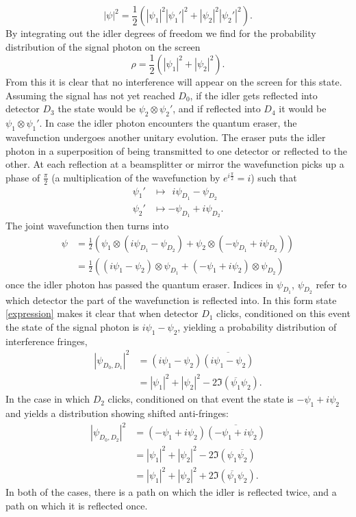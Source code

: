\documentclass[11pt]{article}
\numberwithin{equation}{section}
\begin{document}
\begin{equation}
|\psi|^2= \frac{1}{2}(|\psi_1|^2|\psi_1'|^2+|\psi_2|^2|\psi_2'|^2).
\end{equation} By integrating out the idler degrees of freedom we find for the probability distribution of the signal photon on the screen
\begin{equation}
\rho= \frac{1}{2}(|\psi_1|^2+|\psi_2|^2).
\end{equation} From this it is clear that no interference will appear on the screen for this state. Assuming the signal has not yet reached $D_0$, if the idler gets reflected into detector $D_3$ the state would be $\psi_2\otimes \psi_2'$, and if reflected into $D_4$ it would be $\psi_1\otimes \psi_1'$. 
In case the idler photon encounters the quantum eraser, the wavefunction undergoes another unitary evolution. The eraser puts the idler photon in a superposition of being transmitted to one detector or reflected to the other. At each reflection at a beamsplitter or mirror the wavefunction picks up a phase of $\frac{\pi}{2}$ (a multiplication of the wavefunction by $e^{i\frac{\pi}{2}}=i$) such that
\begin{align}
\psi_1' &\mapsto \ ~ i\psi_{D_1}-\psi_{D_2}\nonumber\\
\psi_2' &\mapsto  -\psi_{D_1}+i\psi_{D_2}.
\end{align} The joint wavefunction then turns into
\begin{align}
\label{expression}
\psi &= \frac{1}{2}(\psi_1\otimes (i\psi_{D_1}-\psi_{D_2})+\psi_2\otimes (-\psi_{D_1}+i\psi_{D_2})) \nonumber \\ &=\frac{1}{2}((i\psi_{1}-\psi_{2})\otimes\psi_{D_1} + (-\psi_{1}+i\psi_{2})\otimes\psi_{D_2})
\end{align} 
once the idler photon has passed the quantum eraser. Indices in $\psi_{D_1}$, $\psi_{D_2}$ refer to which detector the part of the wavefunction is reflected into. In this form state \ref{expression} makes it clear that when detector $D_1$ clicks, conditioned on this event the state of the signal photon is $i\psi_{1}-\psi_{2}$, yielding a probability distribution of interference fringes, 
\begin{align}
|\psi_{D_0, D_1}|^2 &= (i\psi_{1}-\psi_{2})\overline{(i\psi_{1}-\psi_{2})}\nonumber \\
&=|\psi_1|^2+|\psi_2|^2-2\Im(\overline{\psi_1}\psi_2).
\end{align} In the case in which $D_2$ clicks, conditioned on that event the state is $-\psi_{1}+i\psi_{2}$ and yields a distribution showing shifted anti-fringes:
\begin{align}
|\psi_{D_0, D_2}|^2 &= (-\psi_{1}+i\psi_{2})\overline{(-\psi_{1}+i\psi_{2})} \nonumber 
\\ &=|\psi_1|^2+|\psi_2|^2-2\Im(\psi_1\overline{\psi_2}) \nonumber
\\ &=|\psi_1|^2+|\psi_2|^2+2\Im(\overline{\psi_1}\psi_2).
\end{align} In both of the cases, there is a path on which the idler is reflected twice, and a path on which it is reflected once.
\end{document}
